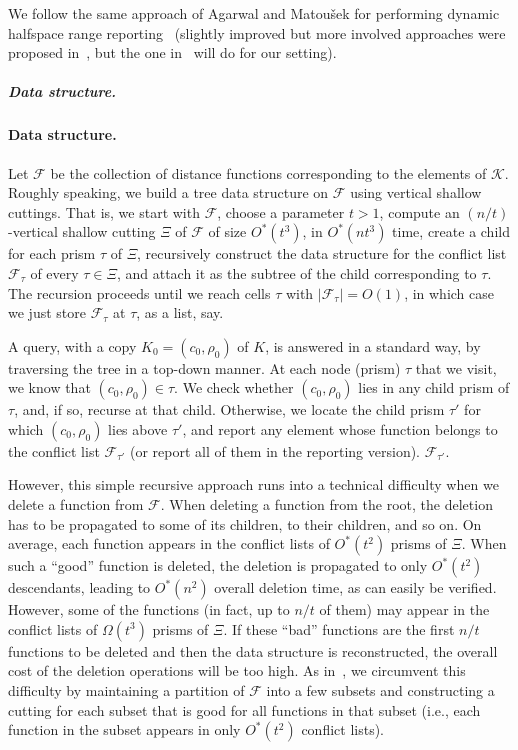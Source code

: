\documentclass[11pt]{article}
\def\F{\mathcal{F}}
\def\K{\mathcal{K}}
\def\cell{\tau}
\theoremstyle{definition}
\begin{document}
We follow the same approach of Agarwal and Matou\v{s}ek for performing dynamic halfspace range 
reporting~\cite{AM95} (slightly improved but more involved approaches were proposed 
in~\cite{Chan:le,KMRSS}, but the one in~\cite{AM95} will do for our setting).  

\ifsocgproc 
\subparagraph*{Data structure.}
\else
\paragraph{Data structure.}
\fi
Let $\F$ be the collection of distance functions corresponding to the elements of $\K$.
Roughly speaking, we build a tree data structure on $\F$ using vertical shallow cuttings. 
That is, we start with $\F$, choose a parameter $t>1$, compute an $(n/t)$-vertical shallow 
cutting $\Xi$ of $\F$ of size $O^*(t^3)$, in $O^*(nt^3)$ time, 
create a child for each prism 
$\cell$ of $\Xi$, recursively construct the data structure for the conflict list 
$\F_\cell$ of every $\cell\in\Xi$, and attach it as the subtree of the child corresponding 
to $\cell$. The recursion proceeds until we reach cells $\cell$ with $|\F_\cell| = O(1)$,
in which case we just store $\F_\cell$ at $\cell$, as a list, say.

A query, with a copy $K_0 = (c_0,\rho_0)$ of $K$, is answered in a standard way, by
traversing the tree in a top-down manner. At each node (prism) $\cell$ that we visit,
we know that $(c_0,\rho_0)\in\cell$. We check whether $(c_0,\rho_0)$ lies in any
child prism of $\cell$, and, if so, recurse at that child. Otherwise, we locate the
child prism $\cell'$ for which $(c_0,\rho_0)$ lies above $\cell'$, and report any
element whose function belongs to the conflict list 
\iffullver
$\F_{\tau'}$ (or report all of them
in the reporting version).
\else
$\F_{\tau'}$.
\fi

However, this simple recursive approach runs into a technical difficulty
when we delete a function from $\F$.
When deleting a function from the root, the deletion has to be propagated to some of 
its children, to their children, and so on. On average, each function appears in 
the conflict lists of $O^*(t^2)$ prisms of $\Xi$. When such a ``good'' function is deleted, 
the deletion is propagated to only $O^*(t^2)$ descendants, leading to $O^*(n^2)$ overall deletion 
time, as can easily be verified. However, some of the functions (in fact, up to $n/t$ of them) may appear 
in the conflict lists of $\Omega(t^3)$ prisms of $\Xi$.
If these ``bad'' functions are the first $n/t$ functions to be deleted and then the data structure 
is reconstructed, the overall cost of the deletion operations will be too high. 
As in~\cite{AM95,KMRSS}, we circumvent this difficulty by maintaining a partition of $\F$ into a few 
subsets and constructing a cutting for each subset that is good for all functions in that subset 
(i.e., each function in the subset appears in only $O^*(t^2)$ conflict lists). 
\end{document}
